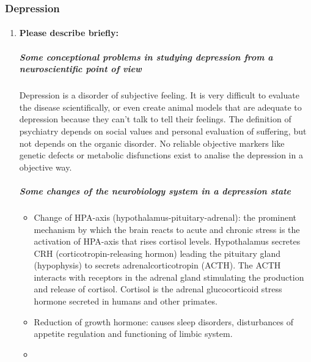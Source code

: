 \documentclass[12pt,article,oneside,a4paper]{memoir}
\begin{document}
\subsubsection{Depression}
\begin{enumerate}
\item \paragraph{Please describe briefly:}
\subparagraph{Some conceptional problems in studying depression from a
neuroscientific point of view} 

Depression is a disorder of subjective feeling. It is very difficult to
evaluate the disease scientifically, or even create animal models that are
adequate to depression because they can't talk to tell their feelings. The
definition of psychiatry depends on social values and personal evaluation of
suffering, but not depends on the organic disorder. No reliable objective
markers like genetic defects or metabolic disfunctions exist to analise the
depression in a objective way.

\subparagraph{Some changes of the neurobiology system in a depression state}
\label{question:neurobiology-depression}
\begin{itemize}
\item Change of HPA-axis (hypothalamus-pituitary-adrenal): the prominent
mechanism by which the brain reacts to acute and chronic stress is the
activation of HPA-axis that rises cortisol levels. Hypothalamus secretes CRH
(corticotropin-releasing hormon) leading the pituitary gland (hypophysis) to
secrets adrenalcorticotropin (ACTH). The ACTH interacts with receptors in the
adrenal gland stimulating the production and release of cortisol. Cortisol is
the adrenal glucocorticoid stress hormone secreted in humans and other
primates.
\item Reduction of growth hormone: causes sleep disorders, disturbances of
appetite regulation and functioning of limbic system.
\item 
\end{itemize}
\end{enumerate}

\end{document}
